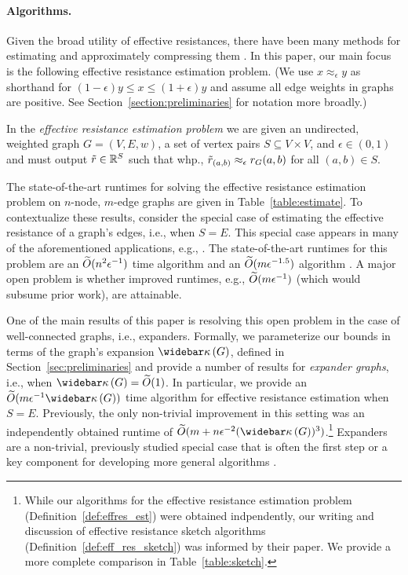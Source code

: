\paragraph{Algorithms.}
Given the broad utility of effective resistances, there have been many methods for estimating and  approximately compressing them \cite{JS2018, li2022new, chu2018graph, spielman2009graph, goranci2018dynamic}. In this paper, our main focus is the following effective resistance estimation problem. (We use $x \approx_\epsilon y$ as shorthand for $(1 - \epsilon) y \leq x \leq (1 + \epsilon) y$ and assume all edge weights in graphs are positive. See Section~\ref{section:preliminaries} for notation more broadly.)

\begin{definition}
\label{def:effres_est}
In the \emph{effective resistance estimation problem} we are given an undirected, weighted graph $G = (V,E,w)$, a set of vertex pairs $S \subseteq V \times V$, and $\epsilon \in (0, 1)$ and must output $\tilde{r} \in \mathbb{R}^{S}$ such that whp., $\tilde{r}_{(a,b)} \approx_\epsilon {r}_{G}(a,b)$ for all $(a,b) \in S$. 
\end{definition}

The state-of-the-art runtimes for solving the effective resistance estimation problem on $n$-node, $m$-edge graphs are given in Table~\ref{table:estimate}. To contextualize these results, consider the special case of estimating the effective resistance of a graph's edges, i.e., when $S = E$. This special case appears in many of the aforementioned applications, e.g., \cite{christiano2010electrical, schild2018, madry2013navigating, madry2016computing,durfee2017sampling}. The state-of-the-art runtimes for this problem are an $\widetilde{O}( {n^2 \epsilon^{-1}} )$ time algorithm \cite{JS2018} and an $\widetilde{O}( {m \epsilon^{-1.5}} )$ algorithm \cite{chu2018graph}. A major open problem is whether improved runtimes, e.g., $\widetilde{O}( {m \epsilon^{-1}} )$ (which would subsume prior work), are attainable.

One of the main results of this paper is resolving this open problem in the case of well-connected graphs, i.e., expanders.
Formally, we parameterize our bounds in terms of the graph's expansion $\pcondOf{G}$, defined in Section~\ref{sec:preliminaries} and provide a number of results for \emph{expander graphs}, i.e., when $\pcondOf{G} = \Otilde{1}$. In particular, we provide an $\Otilde{m \epsilon^{-1} \pcondOf{G}}$ time algorithm for effective resistance estimation when $S = E$. Previously, the only non-trivial improvement in this setting was an independently obtained runtime of  $\Otilde{m + n\epsilon^{-2} (\pcondOf{G})^{3}}$.\footnote{While our algorithms for the effective resistance estimation problem (Definition~\ref{def:effres_est}) were obtained indpendently, our writing and discussion of effective resistance sketch algorithms (Definition~\ref{def:eff_res_sketch}) was informed by their paper. We provide a more complete comparison in Table~\ref{table:sketch}.} Expanders are a non-trivial, previously studied special case that is often the first step or a key component for developing more general algorithms \cite{dinitz2015resistance}. 

